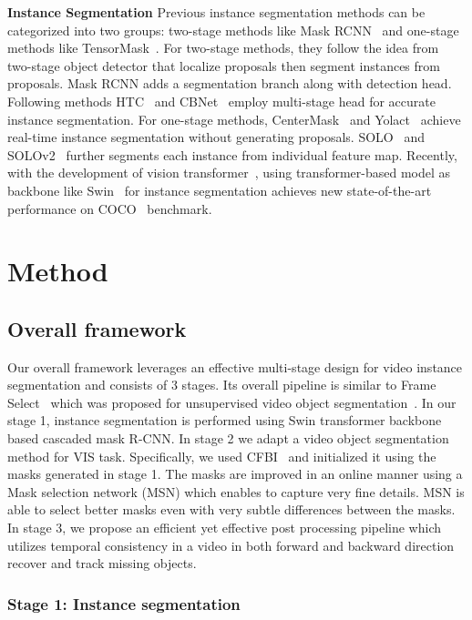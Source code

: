 \documentclass[final]{cvpr}
\begin{document}
\noindent \textbf{Instance Segmentation}
Previous instance segmentation methods can be categorized into two groups: two-stage methods like Mask RCNN~\cite{he2017mask} and one-stage methods like TensorMask~\cite{chen2019tensormask, xu2020deep}. For two-stage methods, they follow the idea from two-stage object detector that localize proposals then segment instances from proposals. Mask RCNN adds a segmentation branch along with detection head. Following methods HTC~\cite{chen2019hybrid} and CBNet~\cite{liu2020cbnet} employ multi-stage head for accurate instance segmentation. For one-stage methods, CenterMask~\cite{lee2020centermask} and Yolact~\cite{bolya2019yolact} achieve real-time instance segmentation without generating proposals. SOLO~\cite{wang2020solo} and SOLOv2~\cite{wang2020solov2} further segments each instance from individual feature map. Recently, with the development of vision transformer~\cite{waswani2017attention, hassani2021escaping}, using transformer-based model as backbone like Swin~\cite{liu2021swin} for instance segmentation achieves new state-of-the-art performance on COCO~\cite{lin2014microsoft} benchmark.



\section{Method}
\subsection{Overall framework}
 Our overall framework leverages an effective multi-stage design for video instance segmentation and consists of 3 stages. Its overall pipeline is similar to Frame Select~\cite{garg2021mask} which was proposed for unsupervised video object segmentation~\cite{Caelles_arXiv_2019}.
 In our stage 1, instance segmentation is performed using Swin transformer backbone~\cite{liu2021swin} based cascaded mask R-CNN. In stage 2 we adapt a video object segmentation method for VIS task. Specifically, we used CFBI~\cite{yang2020collaborative} and initialized it using the masks generated in stage 1. The masks are improved in an online manner using a Mask selection network (MSN) which enables to capture very fine details. MSN is able to select better masks even with very subtle differences between the masks. In stage 3, we propose an efficient yet effective post processing pipeline which utilizes temporal consistency in a video in both forward and backward direction recover and track missing objects.
\subsubsection*{Stage 1: Instance segmentation}
\end{document}
